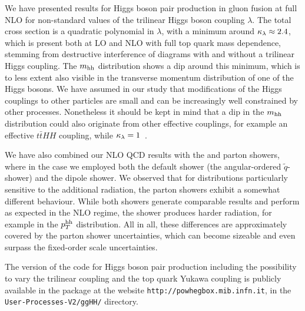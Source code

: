 We have presented results for Higgs boson pair production in gluon
fusion at full NLO for non-standard values of the trilinear Higgs
boson coupling $\lambda$. The total cross section is a quadratic
polynomial in $\lambda$, with a minimum around $\kappa_{\lambda}\approx 2.4$,
which is present both at LO and NLO with full top quark mass
dependence, stemming from destructive interference of diagrams with
and without a trilinear Higgs coupling. 
The $m_{\mathrm{hh}}$ distribution shows a dip around this minimum, which is to
less extent also visible in the transverse momentum distribution of
one of the Higgs bosons. 
We have assumed in our study that modifications of the Higgs couplings
to other particles are small and can be increasingly well constrained by
other processes. Nonetheless it should be kept in mind that a dip in
the $m_{\mathrm{hh}}$ distribution could also originate from other effective
couplings, for example an effective $t\bar{t}HH$ coupling, while
$\kappa_{\lambda}= 1$~\cite{Buchalla:2018yce}.

We have also combined our NLO QCD results with the \pythia and \herwig
parton showers, where in the \herwig case we employed both the default 
shower (the angular-ordered $\tilde{q}$-shower) and the dipole shower.
We observed that for distributions particularly sensitive to the 
additional radiation, the parton showers exhibit a somewhat different 
behaviour. While both \herw showers generate comparable results and 
perform as expected in the NLO regime, the \pythia shower produces harder 
radiation, for example in the $p_T^{\mathrm{hh}}$ distribution. All in all, these 
differences are approximately covered by the parton shower uncertainties, 
which can become sizeable and even surpass the fixed-order scale uncertainties.

The \powheg{} version of the code for Higgs boson pair production
including the possibility to vary the trilinear coupling 
and the top quark Yukawa coupling 
is publicly available in the  package at the website
{\tt http://powhegbox.mib.infn.it}, in the
{\tt User-Processes-V2/ggHH/} directory.
